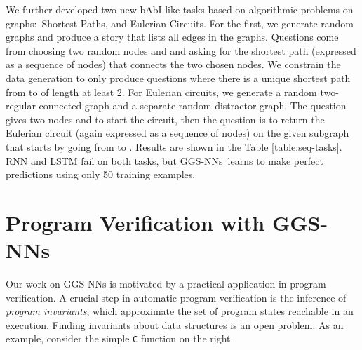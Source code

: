 \documentclass{article} \usepackage{iclr2016_conference,times}
\newcommand{\OurMethodShort}{GGS-NN}
\newcommand{\OurMethodShorts}{\OurMethodShort s}
\begin{document}
We further developed two new bAbI-like tasks based on algorithmic problems
on graphs:~Shortest Paths, and Eulerian Circuits. For the first, we generate
random graphs and produce a story that lists all edges in the graphs. 
Questions come from choosing two random nodes  and  and asking for the shortest
path (expressed as a sequence of nodes) that connects the two chosen nodes.
We constrain the data generation to only produce questions where there is a
unique shortest path from  to  of length at least 2. For Eulerian circuits,
we generate a random two-regular connected graph and a separate random distractor
graph. The question gives two nodes  and  to start  the circuit, then
the question is to return the Eulerian circuit (again expressed as a sequence of nodes)
on the given subgraph that starts by going from  to . Results are shown
in the Table \ref{table:seq-tasks}.  RNN and LSTM fail
on both tasks, but \OurMethodShorts~learns to make perfect predictions using
only 50 training examples.





 


\section{Program Verification with \OurMethodShorts}
\label{sect:ProgramVerification}

Our work on \OurMethodShorts{} is motivated by a practical application in
program verification.
A crucial step in automatic program verification is the inference of
\emph{program invariants}, which
approximate the set of program states
reachable in an execution.
Finding invariants about data structures is an open problem.
As an example, consider the simple \texttt{C} function on the right.
\end{document}
